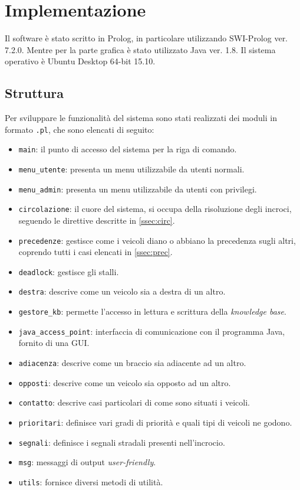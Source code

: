 \chapter{Implementazione}

Il software è stato scritto in Prolog, in particolare utilizzando SWI-Prolog ver. 7.2.0. Mentre per la parte grafica è stato utilizzato Java ver. 1.8. Il sistema operativo è Ubuntu Desktop 64-bit 15.10.

\section{Struttura}
Per sviluppare le funzionalità del sistema sono stati realizzati dei moduli in formato \texttt{.pl}, che sono elencati di seguito:
\begin{itemize}
\item \texttt{main}: il punto di accesso del sistema per la riga di comando.
\item \texttt{menu\_utente}: presenta un menu utilizzabile da utenti normali.
\item \texttt{menu\_admin}: presenta un menu utilizzabile da utenti con privilegi.
\item \texttt{circolazione}: il cuore del sistema, si occupa della risoluzione degli incroci, seguendo le direttive descritte in \ref{ssec:circ}.
\item \texttt{precedenze}: gestisce come i veicoli diano o abbiano la precedenza sugli altri, coprendo tutti i casi elencati in \ref{ssec:prec}.
\item \texttt{deadlock}: gestisce gli stalli.
\item \texttt{destra}: descrive come un veicolo sia a destra di un altro.
\item \texttt{gestore\_kb}: permette l'accesso in lettura e scrittura della \emph{knowledge base}.
\item \texttt{java\_access\_point}: interfaccia di comunicazione con il programma Java, fornito di una GUI.
\item \texttt{adiacenza}: descrive come un braccio sia adiacente ad un altro.
\item \texttt{opposti}: descrive come un veicolo sia opposto ad un altro.
\item \texttt{contatto}: descrive casi particolari di come sono situati i veicoli.
\item \texttt{prioritari}: definisce vari gradi di priorità e quali tipi di veicoli ne godono.
\item \texttt{segnali}: definisce i segnali stradali presenti nell'incrocio.
\item \texttt{msg}: messaggi di output \emph{user-friendly}.
\item \texttt{utils}: fornisce diversi metodi di utilità.
\end{itemize}

